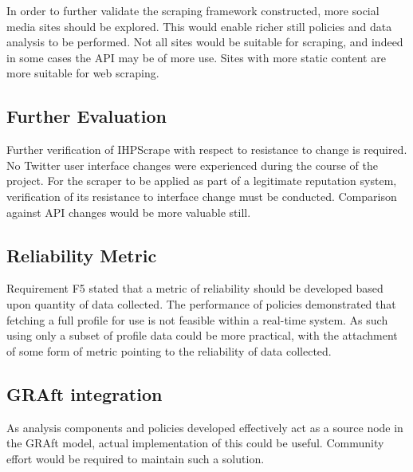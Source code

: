 In order to further validate the scraping framework constructed, more social media sites should be explored. This would enable richer still policies and data analysis to be performed. Not all sites would be suitable for scraping, and indeed in some cases the API may be of more use. Sites with more static content are more suitable for web scraping. 

\subsection{Further Evaluation}

Further verification of IHPScrape with respect to resistance to change is required. No Twitter user interface changes were experienced during the course of the project. For the scraper to be applied as part of a legitimate reputation system, verification of its resistance to interface change must be conducted. Comparison against API changes would be more valuable still.

\subsection{Reliability Metric}

Requirement F5 stated that a metric of reliability should be developed based upon quantity of data collected. The performance of policies demonstrated that fetching a full profile for use is not feasible within a real-time system. As such using only a subset of profile data could be more practical, with the attachment of some form of metric pointing to the reliability of data collected.

\subsection{GRAft integration}

As analysis components and policies developed effectively act as a source node in the GRAft model, actual implementation of this could be useful. Community effort would be required to maintain such a solution.